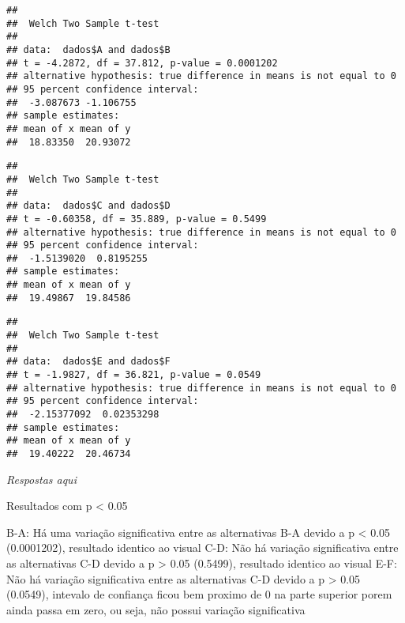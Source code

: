 \documentclass[
]{article}
\newenvironment{Shaded}{\begin{snugshade}}{\end{snugshade}}
\newcommand{\AttributeTok}[1]{\textcolor[rgb]{0.13,0.29,0.53}{#1}}
\newcommand{\FloatTok}[1]{\textcolor[rgb]{0.00,0.00,0.81}{#1}}
\newcommand{\FunctionTok}[1]{\textcolor[rgb]{0.13,0.29,0.53}{\textbf{#1}}}
\newcommand{\NormalTok}[1]{#1}
\newcommand{\OtherTok}[1]{\textcolor[rgb]{0.56,0.35,0.01}{#1}}
\newcommand{\SpecialCharTok}[1]{\textcolor[rgb]{0.81,0.36,0.00}{\textbf{#1}}}
\begin{document}
\begin{verbatim}
## 
##  Welch Two Sample t-test
## 
## data:  dados$A and dados$B
## t = -4.2872, df = 37.812, p-value = 0.0001202
## alternative hypothesis: true difference in means is not equal to 0
## 95 percent confidence interval:
##  -3.087673 -1.106755
## sample estimates:
## mean of x mean of y 
##  18.83350  20.93072
\end{verbatim}

\begin{Shaded}
\end{Shaded}

\begin{verbatim}
## 
##  Welch Two Sample t-test
## 
## data:  dados$C and dados$D
## t = -0.60358, df = 35.889, p-value = 0.5499
## alternative hypothesis: true difference in means is not equal to 0
## 95 percent confidence interval:
##  -1.5139020  0.8195255
## sample estimates:
## mean of x mean of y 
##  19.49867  19.84586
\end{verbatim}

\begin{Shaded}
\end{Shaded}

\begin{verbatim}
## 
##  Welch Two Sample t-test
## 
## data:  dados$E and dados$F
## t = -1.9827, df = 36.821, p-value = 0.0549
## alternative hypothesis: true difference in means is not equal to 0
## 95 percent confidence interval:
##  -2.15377092  0.02353298
## sample estimates:
## mean of x mean of y 
##  19.40222  20.46734
\end{verbatim}

\emph{Respostas aqui}

Resultados com p \textless{} 0.05

B-A: Há uma variação significativa entre as alternativas B-A devido a p
\textless{} 0.05 (0.0001202), resultado identico ao visual C-D: Não há
variação significativa entre as alternativas C-D devido a p
\textgreater{} 0.05 (0.5499), resultado identico ao visual E-F: Não há
variação significativa entre as alternativas C-D devido a p
\textgreater{} 0.05 (0.0549), intevalo de confiança ficou bem proximo de
0 na parte superior porem ainda passa em zero, ou seja, não possui
variação significativa
\end{document}
